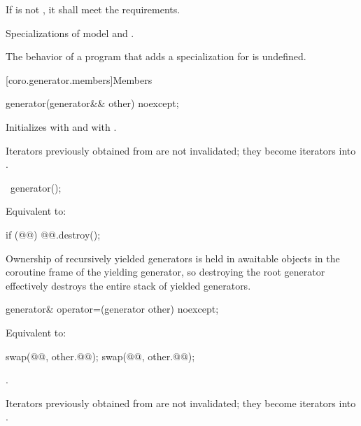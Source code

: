 \pnum
If  is not ,
it shall meet the  requirements.

\pnum
Specializations of  model
 and .

\pnum
The behavior of a program that adds a specialization
for  is undefined.

[coro.generator.members]{Members}

%
\begin{itemdecl}
generator(generator&& other) noexcept;
\end{itemdecl}

\begin{itemdescr}
\pnum
\effects
Initializes  with
 and
 with
.

\pnum
\begin{note}
Iterators previously obtained from  are not invalidated;
they become iterators into .
\end{note}
\end{itemdescr}

%
\begin{itemdecl}
~generator();
\end{itemdecl}

\begin{itemdescr}
\pnum
\effects
Equivalent to:
\begin{codeblock}
if (@@) {
  @@.destroy();
}
\end{codeblock}

\pnum
\begin{note}
Ownership of recursively yielded generators
is held in awaitable objects
in the coroutine frame of the yielding generator,
so destroying the root generator
effectively destroys the entire stack of yielded generators.
\end{note}
\end{itemdescr}

%
\begin{itemdecl}
generator& operator=(generator other) noexcept;
\end{itemdecl}

\begin{itemdescr}
\pnum
\effects
Equivalent to:
\begin{codeblock}
swap(@@, other.@@);
swap(@@, other.@@);
\end{codeblock}

\pnum
\returns
{}.

\pnum
\begin{note}
Iterators previously obtained from  are not invalidated;
they become iterators into .
\end{note}
\end{itemdescr}

